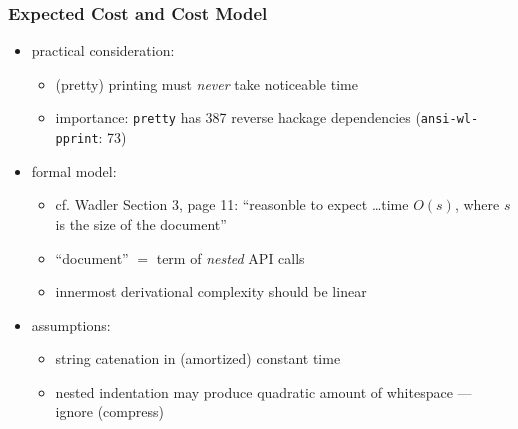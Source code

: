 \begin{frame}[fragile]
\frametitle{Expected Cost and Cost Model}

  \begin{itemize}[<+->]
\item
practical consideration: 
  \begin{itemize}
  \item (pretty) printing must \emph{never} take noticeable time
  \item importance: \texttt{pretty} has  387 reverse hackage dependencies (\texttt{ansi-wl-pprint}: 73)
  \end{itemize}
\item formal model:
\begin{itemize}
\item cf. Wadler Section 3, page 11:
  ``reasonble to expect \dots time $O(s)$,
  where $s$ is the size of the document''
  \item ``document'' $=$ term of \emph{nested} API calls
\item innermost derivational complexity  
  should be linear
\end{itemize}
\item assumptions:
  \begin{itemize}
  \item string catenation in (amortized) constant time
  \item nested indentation may produce
    quadratic amount of whitespace --- ignore (compress)
  \end{itemize}
\end{itemize}
\end{frame}
